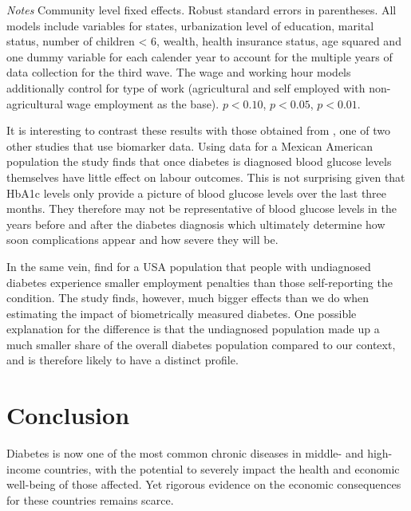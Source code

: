 \documentclass[12pt,english]{article}
\begin{document}
\begin{table}[h]
\begin{center}
\begin{adjustbox}{max width=\linewidth}
\begin{threeparttable}
{\begin{tabular}{l*{6}{S
S}}
\bottomrule
\end{tabular}
\begin{tablenotes}
\item \footnotesize \textit{Notes} Community level fixed effects. Robust standard errors in parentheses. All models include variables for  states, urbanization level of education, marital status, number of children < 6, wealth, health insurance status, age squared and one dummy variable for each calender year to account for the multiple years of data collection for the third wave. The wage and working hour models additionally control for type of work (agricultural and self employed with non-agricultural wage employment as the base). \sym{*} \(p<0.10\), \sym{**} \(p<0.05\), \sym{***} \(p<0.01\).
\end{tablenotes}
}
\end{threeparttable}
\end{adjustbox}
\end{center}
\end{table}

It is interesting to contrast these results with those obtained from \textcite{BrownIII2011}, one of two other studies that use biomarker data. Using data for a Mexican American population the study finds that once diabetes is diagnosed blood glucose levels themselves have little effect on labour outcomes. This is not surprising given that HbA1c levels only provide a picture of blood glucose levels over the last three months. They therefore may not be representative of blood glucose levels in the years before and after the diabetes diagnosis which ultimately determine how soon complications appear and how severe they will be.

In the same vein, \textcite{Minor2015} find for a USA population that people with undiagnosed diabetes experience smaller employment penalties than those self-reporting the condition. The study finds, however, much bigger effects than we do when estimating the impact of biometrically measured diabetes. One possible explanation for the difference is that the undiagnosed population made up a much smaller share of the overall diabetes population compared to our context, and is therefore likely to have a distinct profile.
\FloatBarrier


\section{\label{sec:cha_4_conclusion}Conclusion}

Diabetes is now one of the most common chronic diseases in middle- and high-income countries, with the potential to severely impact the health and economic well-being of those affected. Yet rigorous evidence on the economic consequences for these countries remains scarce.
\end{document}
